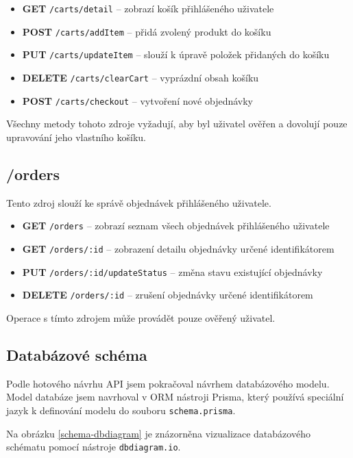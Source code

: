 \documentclass[thesis=M,czech]{FITthesis}[2019/12/23]
\begin{document}
\begin{itemize}
  \item \textbf{GET} \texttt{/carts/detail} -- zobrazí košík přihlášeného uživatele
  \item \textbf{POST} \texttt{/carts/addItem} -- přidá zvolený produkt do košíku
  \item \textbf{PUT} \texttt{/carts/updateItem} -- slouží k úpravě položek přidaných do košíku
  \item \textbf{DELETE} \texttt{/carts/clearCart} -- vyprázdní obsah košíku
  \item \textbf{POST} \texttt{/carts/checkout} -- vytvoření nové objednávky
\end{itemize}

Všechny metody tohoto zdroje vyžadují, aby byl uživatel ověřen a dovolují pouze upravování jeho vlastního košíku.

\subsection{/orders}
Tento zdroj slouží ke správě objednávek přihlášeného uživatele.

\begin{itemize}
  \item \textbf{GET} \texttt{/orders} -- zobrazí seznam všech objednávek přihlášeného uživatele
  \item \textbf{GET} \texttt{/orders/:id} -- zobrazení detailu objednávky určené identifikátorem
  \item \textbf{PUT} \texttt{/orders/:id/updateStatus} -- změna stavu existující objednávky
  \item \textbf{DELETE} \texttt{/orders/:id} -- zrušení objednávky určené identifikátorem
\end{itemize}

Operace s tímto zdrojem může provádět pouze ověřený uživatel.

\subsection{Databázové schéma}
Podle hotového návrhu API jsem pokračoval návrhem databázového modelu. Model databáze jsem navrhoval v ORM nástroji Prisma, který používá speciální jazyk k definování modelu do souboru \texttt{schema.prisma}.

Na obrázku \ref{schema-dbdiagram} je znázorněna vizualizace databázového schématu pomocí nástroje \texttt{dbdiagram.io}.
\end{document}
